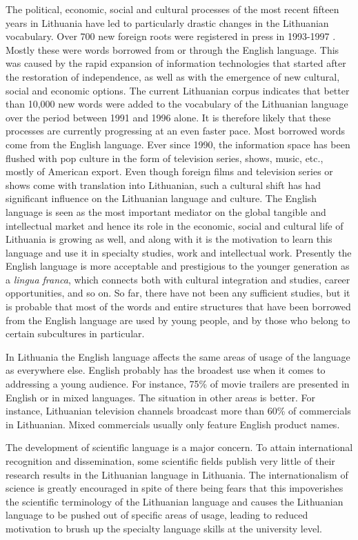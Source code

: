 \begin{multicols}{2}
The political, economic, social and cultural processes of the most recent fifteen years in Lithuania have led to particularly drastic changes in the Lithuanian vocabulary. Over 700 new foreign roots were registered in press in 1993-1997 \cite{nbi1}.  Mostly these were words borrowed from or through the English language. This was caused by the rapid expansion of information technologies that started after the restoration of independence, as well as with the emergence of new cultural, social and economic options. The current Lithuanian corpus indicates that better than 10,000 new words were added to the vocabulary of the Lithuanian language over the period between 1991 and 1996 alone. It is therefore likely that these processes are currently progressing at an even faster pace. Most borrowed words come from the English language. Ever since 1990, the information space has been flushed with pop culture in the form of television series, shows, music, etc., mostly of American export. Even though foreign films and television series or shows come with translation into Lithuanian, such a cultural shift has had significant influence on the Lithuanian language and culture. The English language is seen as the most important mediator on the global tangible and intellectual market and hence its role in the economic, social and cultural life of Lithuania is growing as well, and along with it is the motivation to learn this language and use it in specialty studies, work and intellectual work. Presently the English language is more acceptable and prestigious to the younger generation as a \textit{lingua franca}, which connects both with cultural integration and studies, career opportunities, and so on. So far, there have not been any sufficient studies, but it is probable that most of the words and entire structures that have been borrowed from the English language are used by young people, and by those who belong to certain subcultures in particular.

In Lithuania the English language affects the same areas of usage of the language as everywhere else. English probably has the broadest use when it comes to addressing a young audience. For instance, 75\% of movie trailers are presented in English or in mixed languages. The situation in other areas is better. For instance, Lithuanian television channels broadcast more than 60\% of commercials in Lithuanian. Mixed commercials usually only feature English product names\cite{nbi2}.

The development of scientific language is a major concern. To attain international recognition and dissemination, some scientific fields publish very little of their research results in the Lithuanian language in Lithuania. The internationalism of science is greatly encouraged in spite of there being fears that this impoverishes the scientific terminology of the Lithuanian language and causes the Lithuanian language to be pushed out of specific areas of usage, leading to reduced motivation to brush up the specialty language skills at the university level.


\end{multicols}
